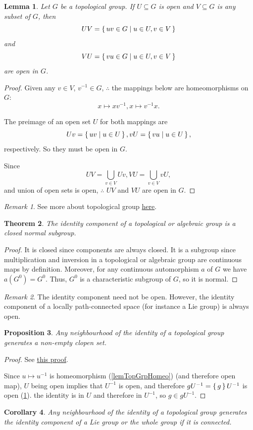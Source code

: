 \documentclass[12pt, letterpaper]{article}
\newtheorem{prop}{Proposition}[section]
\newtheorem{lem}[prop]{Lemma}
\newtheorem{cor}[prop]{Corollary}
\newtheorem{thm}[prop]{Theorem}
\theoremstyle{definition}
\theoremstyle{remark}
\newtheorem*{rem*}{Remark}
\theoremstyle{definition}
\theoremstyle{plain}
\numberwithin{equation}{section}
\begin{document}
	\begin{lem}\label{lemUVopen}
		Let $G$
		be a topological group. If 
		$U\subseteq G$
		is open and 
		$V\subseteq G$
		is any subset of $G$, then 
		\[UV=\set{ uv\in G| u\in U, v\in V} \]
		and
		\[VU=\set{ vu\in G| u\in U, v\in V} \]
		are open in $G$.
	\end{lem}
	\begin{proof}
		Given any $v\in V$, $v^{-1}\in G$, $\therefore$ the mappings below are homeomorphisms on $G$:
		\[ x\mapsto xv^{-1}, x\mapsto v^{-1}x.  \]
		
		The preimage of an open set $U$ for both mappings are
		\[Uv=\set{uv|u\in U},vU=\set{vu|u\in U},\]
		respectively. So they must be open in $G$.

		Since
		\[ UV=\bigcup _{v\in V}Uv, VU=\bigcup_{v\in V}vU, \]
		and union of open sets is open, $\therefore$ $UV$ and $VU$ are open in $G$.
	\end{proof}
	\begin{rem*}
		See more about topological group \href{https://planetmath.org/BasicResultsInTopologicalGroups}{here}.
	\end{rem*}

	\begin{thm}
		The identity component of a topological or algebraic group is a closed normal subgroup.
	\end{thm}
	\begin{proof}
		It is closed since components are always closed.
		It is a subgroup since multiplication and inversion in a topological or algebraic group are continuous maps by definition.
		Moreover, for any continuous automorphism $a$ of $G$ we have
		$a(G^0) = G^0$.
		Thus, $G^0$ is a characteristic subgroup of $G$, so it is normal.
	\end{proof}
	\begin{rem*}
		The identity component  need not be open.
		However, the identity component of a locally path-connected space (for instance a Lie group) is always open.
	\end{rem*}

	\begin{prop}
		Any neighbourhood of the identity of a topological group generates a non-empty clopen set.
	\end{prop}
	\begin{proof}
		See \href{https://planetmath.org/connectedtopologicalgroupisgeneratedbyanyneighborhoodofidentity}{this proof}.
		
		Since $u\mapsto u^{-1}$ is homeomorphism (\ref{lemTopGrpHomeo}) (and therefore open map),
		$U$ being open implies that $U^{-1}$ is open, and therefore $gU^{-1}=\set{g} U^{-1}$ is open (\ref{lemUVopen}).
		the identity is in $U$ and therefore in $U^{-1}$, so $g\in gU^{-1}$.
	\end{proof}
	\begin{cor}\label{corExe8.1}
		Any neighbourhood of the identity of a topological group generates the identity component of a Lie group
		or the whole group if it is connected.
	\end{cor}
	
\end{document}
